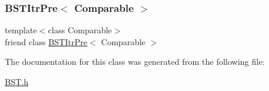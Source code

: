 \mbox{\label{class_binary_node_a45a55df6f11541416d4ea7684c575c1a}} 
\subsubsection{\texorpdfstring{B\+S\+T\+Itr\+Pre$<$ Comparable $>$}{BSTItrPre< Comparable >}}
{\footnotesize\ttfamily template$<$class Comparable$>$ \\
friend class \hyperlink{class_b_s_t_itr_pre}{B\+S\+T\+Itr\+Pre}$<$ Comparable $>$\hspace{0.3cm}{\ttfamily [friend]}}



The documentation for this class was generated from the following file\+:\begin{DoxyCompactItemize}
\item 
\hyperlink{_b_s_t_8h}{B\+S\+T.\+h}\end{DoxyCompactItemize}
